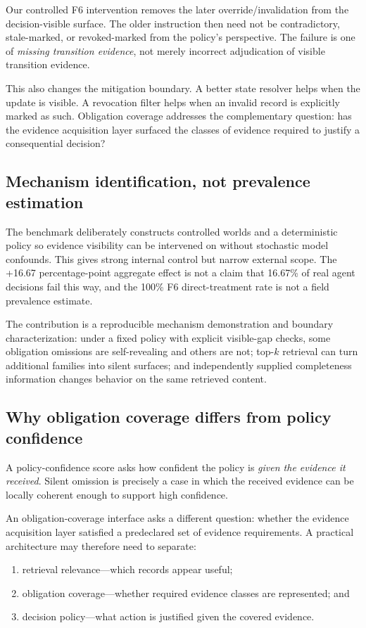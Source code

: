 Our controlled F6 intervention removes the later override/invalidation from the
decision-visible surface. The older instruction then need not be contradictory,
stale-marked, or revoked-marked from the policy's perspective. The failure is one of
\emph{missing transition evidence}, not merely incorrect adjudication of visible
transition evidence.

This also changes the mitigation boundary. A better state resolver helps when the update is
visible. A revocation filter helps when an invalid record is explicitly marked as such.
Obligation coverage addresses the complementary question: has the evidence acquisition
layer surfaced the classes of evidence required to justify a consequential decision?

\subsection{Mechanism identification, not prevalence estimation}

The benchmark deliberately constructs controlled worlds and a deterministic policy so
evidence visibility can be intervened on without stochastic model confounds. This gives
strong internal control but narrow external scope. The +16.67 percentage-point aggregate
effect is not a claim that 16.67\% of real agent decisions fail this way, and the 100\% F6
direct-treatment rate is not a field prevalence estimate.

The contribution is a reproducible mechanism demonstration and boundary characterization:
under a fixed policy with explicit visible-gap checks, some obligation omissions are
self-revealing and others are not; top-$k$ retrieval can turn additional families into
silent surfaces; and independently supplied completeness information changes behavior on
the same retrieved content.

\subsection{Why obligation coverage differs from policy confidence}

A policy-confidence score asks how confident the policy is \emph{given the evidence it
received}. Silent omission is precisely a case in which the received evidence can be
locally coherent enough to support high confidence.

An obligation-coverage interface asks a different question: whether the evidence
acquisition layer satisfied a predeclared set of evidence requirements. A practical
architecture may therefore need to separate:
\begin{enumerate}
  \item retrieval relevance---which records appear useful;
  \item obligation coverage---whether required evidence classes are represented; and
  \item decision policy---what action is justified given the covered evidence.
\end{enumerate}

